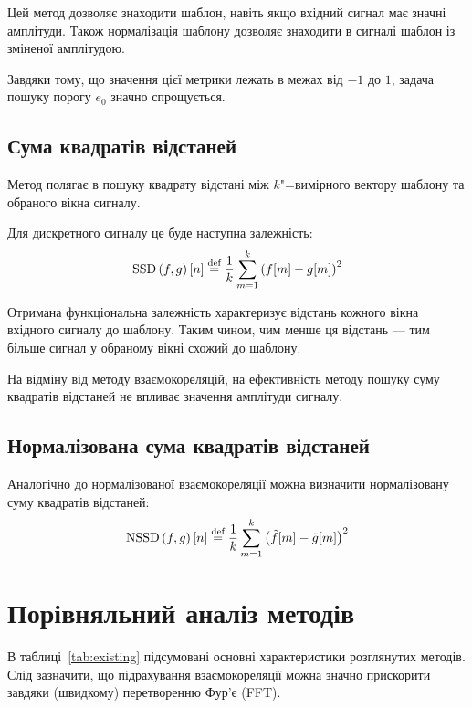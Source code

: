         Цей метод дозволяє знаходити шаблон, навіть якщо вхідний сигнал має значні  амплітуди.
        Також нормалізація шаблону дозволяє знаходити в сигналі шаблон із зміненої амплітудою.

        Завдяки тому, що значення цієї метрики лежать в межах від ${-1}$ до $1$, задача пошуку порогу $e_0$ значно
        спрощується.

    \subsection{Сума квадратів відстаней}
        Метод полягає в пошуку квадрату відстані між $k$"=вимірного вектору шаблону та обраного вікна сигналу.

        Для дискретного сигналу це буде наступна залежність:
        \begin{equation}
            \text{SSD}\left(f, g\right)[ n ] \stackrel{\text{def}}{=} \frac{1}{k}\sum\limits_{m=1}^k {\left(f[m] - g[m]\right)}^2
        \end{equation}

        Отримана функціональна залежність характеризує відстань кожного вікна вхідного сигналу до шаблону.
        Таким чином, чим менше ця відстань --- тим більше сигнал у обраному вікні схожий до шаблону.

        На відміну від методу взаємокореляцій, на ефективність методу пошуку суму квадратів відстаней не впливає
        значення амплітуди сигналу.
    \subsection{Нормалізована сума квадратів відстаней}
        Аналогічно до нормалізованої взаємокореляції можна визначити нормалізовану суму квадратів відстаней:
        \begin{equation}
            \text{NSSD}\left(f, g\right)[ n ] \stackrel{\text{def}}{=} \frac{1}{k}\sum\limits_{m=1}^k {\left(\tilde{f}[m] -
                    \tilde{g}[m]\right)}^2
        \end{equation}

\section{Порівняльний аналіз методів}
\label{s:existing-compare}
    В таблиці~\ref{tab:existing} підсумовані основні характеристики розглянутих методів.
    Слід зазначити, що підрахування взаємокореляції можна значно прискорити завдяки (швидкому) перетворенню Фур’є
    (FFT).

